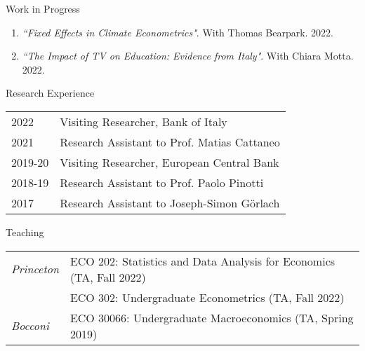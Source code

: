\documentclass{resume} %
\begin{document}
\begin{rSection}{Work in Progress} 

\begin{enumerate}

\item \textit{``Fixed Effects in Climate Econometrics"}. With Thomas Bearpark. 2022.

\item \textit{``The Impact of TV on Education: Evidence from Italy"}. With Chiara Motta. 2022.
\end{enumerate}

\end{rSection}


\begin{rSection}{Research Experience}
\begin{tabular}{@{\hspace{0cm}}ll}
2022 & Visiting Researcher, Bank of Italy \\
2021 & Research Assistant to Prof. Matias Cattaneo \\
2019-20 & Visiting Researcher, European Central Bank \\
2018-19 & Research Assistant to Prof. Paolo Pinotti \\
2017 & Research Assistant to Joseph-Simon G\"{o}rlach
\end{tabular}
\end{rSection}


\begin{rSection}{Teaching}
\begin{tabular}{@{\hspace{0cm}}ll}
{\it Princeton} & ECO 202: Statistics and Data Analysis for Economics (TA, Fall 2022) \medskip \\
& ECO 302: Undergraduate Econometrics (TA, Fall 2022) \bigskip \\
{\it Bocconi} & ECO 30066: Undergraduate Macroeconomics (TA, Spring 2019)
\end{tabular}
\end{rSection}
\end{document}
